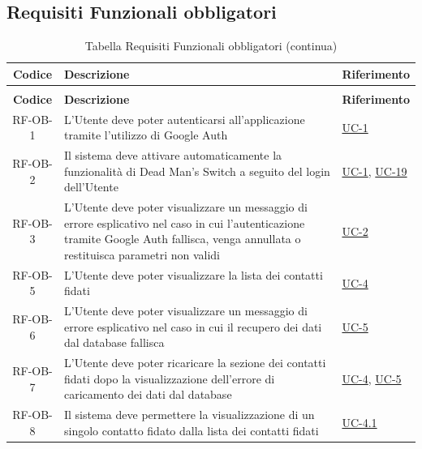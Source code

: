 \documentclass[a4paper,12pt]{article}
\begin{document}
\subsection{Requisiti Funzionali obbligatori} \label{subsection:requisiti_funzionali_obbligatori}
\begin{center}
\renewcommand{\arraystretch}{1.5}

\begin{longtable}{|c|p{8.5cm}|>{\centering\arraybackslash}p{4cm}|}

\hline
\rowcolor{gray!60}
\textbf{Codice} & \textbf{Descrizione} & \textbf{Riferimento} \\
\hline
\endfirsthead
\caption[]{Tabella Requisiti Funzionali obbligatori (continua)} \\
\hline
\rowcolor{gray!60}
\textbf{Codice} & \textbf{Descrizione} & \textbf{Riferimento} \\
\hline
\endhead


RF-OB-1 & L'Utente deve poter autenticarsi all'applicazione tramite l'utilizzo di Google Auth & \hyperref[subsec:UC-1]{UC-1} \\
\hline

RF-OB-2 & Il sistema deve attivare automaticamente la funzionalità di Dead Man's Switch a seguito del login dell'Utente & \hyperref[subsec:UC-1]{UC-1}, \hyperref[sec:UC-19]{UC-19} \\
\hline

RF-OB-3 & L'Utente deve poter visualizzare un messaggio di errore esplicativo nel caso in cui l'autenticazione tramite Google Auth fallisca, venga annullata o restituisca parametri non validi & \hyperref[subsec:UC-2]{UC-2} \\
\hline

RF-OB-5 & L'Utente deve poter visualizzare la lista dei contatti fidati & \hyperref[sec:UC-4]{UC-4} \\
\hline

RF-OB-6 & L'Utente deve poter visualizzare un messaggio di errore esplicativo nel caso in cui il recupero dei dati dal database fallisca & \hyperref[sec:UC-5]{UC-5} \\
\hline

RF-OB-7 & L'Utente deve poter ricaricare la sezione dei contatti fidati dopo la visualizzazione dell'errore di caricamento dei dati dal database & \hyperref[sec:UC-4]{UC-4}, \hyperref[sec:UC-5]{UC-5} \\
\hline

RF-OB-8 & Il sistema deve permettere la visualizzazione di un singolo contatto fidato dalla lista dei contatti fidati & \hyperref[subsec:UC-4.1]{UC-4.1} \\
\hline


\end{longtable}
\end{center}
\end{document}
